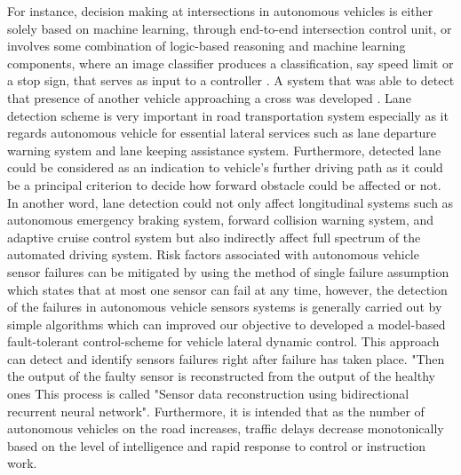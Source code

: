 \documentclass{book}
\begin{document}
For instance, decision making at intersections in autonomous vehicles is either solely based on machine learning, through end-to-end intersection control unit, or involves some combination of logic-based reasoning and machine learning components, where an image classifier produces a classification, say speed limit or a stop sign, that serves as input to a controller \cite{huang2017safety,amodei2016concrete,seshia2016towards}. A system that was able to detect that presence of another vehicle approaching a cross was developed \cite{milanes2010controller,claes2011decentralized,zeng2015novel,eguchi2007discrimination}. Lane detection scheme is very important in road transportation system especially as it regards autonomous vehicle for essential lateral services such as lane departure warning system and lane keeping assistance system. Furthermore, detected lane could be considered as an indication to vehicle's further driving path as it could be a principal criterion to decide how forward obstacle could be affected or not. In another word, lane detection could not only affect longitudinal systems such as autonomous emergency braking system, forward collision warning system, and adaptive cruise control system but also indirectly affect full spectrum of the automated driving system\cite{song2017novel,dickmanns1992recursive,kim2008robust,siogkas2013random}. Risk factors associated with autonomous vehicle sensor failures can be mitigated by using the method of single failure assumption which states that at most one sensor can fail at any time, however, the detection of the failures in autonomous vehicle sensors  systems is generally carried out by simple algorithms which can improved our objective to developed a model-based fault-tolerant control-scheme for vehicle lateral dynamic control. This approach can detect and identify sensors failures right after failure has taken place. "Then the output of the faulty sensor is reconstructed from the output of the healthy ones \cite{oudghiri2007fuzzy,kienke2000automotive,staroswiecki2005fault} This process is called "Sensor data reconstruction using bidirectional recurrent neural network". Furthermore, it is intended  that as the number of autonomous vehicles on the road increases, traffic delays decrease monotonically based on the level of intelligence and rapid response to control or instruction work.
\end{document}
